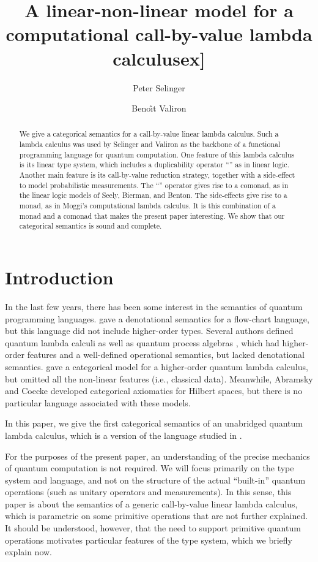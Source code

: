 \documentclass{llncs}
\title{A linear-non-linear model for a computational call-by-value lambda calculus\0ex]}
\author{Peter Selinger\inst{1} \and Beno\^{\i}t Valiron\inst{2}}
\institute{
  Dalhousie University,
  \email{selinger@mathstat.dal.ca}
  \and
  University of Ottawa,
  \email{bvali087@uottawa.ca}
}
\begin{document}
\maketitle

\begin{abstract}
  We give a categorical semantics for a call-by-value linear lambda
  calculus. Such a lambda calculus was used by Selinger and Valiron as
  the backbone of a functional programming language for quantum
  computation. One feature of this lambda calculus is its linear type system,
  which includes a duplicability operator ``'' as in linear logic.
  Another main feature is its call-by-value reduction strategy,
  together with a side-effect to model probabilistic measurements. The
  ``'' operator gives rise to a comonad, as in the linear logic
  models of Seely, Bierman, and Benton. The side-effects give rise to
  a monad, as in Moggi's computational lambda calculus.  It is this
  combination of a monad and a comonad that makes the present paper
  interesting. We show that our categorical semantics is sound and
  complete.
\end{abstract}



\section{Introduction}

In the last few years, there has been some interest in the semantics
of quantum programming languages.
{\cite{selinger04quantum}} gave a denotational
semantics for a flow-chart language, but this language did not include
higher-order types. Several authors defined quantum lambda calculi
{\cite{tonder04lambda,selinger05lambda}} as well as quantum process
algebras {\cite{GaySJ:comqp,LalJor}}, which had higher-order features
and a well-defined operational semantics, but lacked denotational
semantics. \cite{valiron06fully} gave a categorical model for a
higher-order quantum lambda calculus, but omitted all the non-linear
features (i.e., classical data).  Meanwhile, Abramsky and Coecke
{\cite{abramsky04categorical,coecke04informationflow}}
developed categorical axiomatics for Hilbert spaces, but there is
no particular language associated with these models.

In this paper, we give the first categorical semantics of an
unabridged quantum lambda calculus, which is a version of the language
studied in {\cite{selinger05lambda}}. 

For the purposes of the present paper, an understanding of the precise
mechanics of quantum computation is not required. We will focus
primarily on the type system and language, and not on the structure of
the actual ``built-in'' quantum operations (such as unitary operators
and measurements). In this sense, this paper is about the semantics of
a generic call-by-value linear lambda calculus, which is parametric on
some primitive operations that are not further explained. It should be
understood, however, that the need to support primitive quantum
operations motivates particular features of the type system, which we
briefly explain now.
\end{document}
